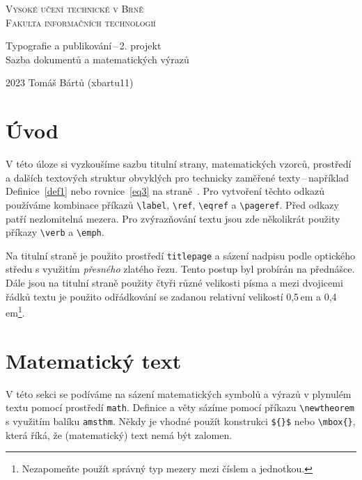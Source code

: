 \documentclass[a4paper,twocolumn,11pt]{article}[06-03-2022]
\theoremstyle{definition}
\begin{document}
\begin{titlepage}
    \begin{center}
        {\Huge \textsc{Vysoké učení technické v Brně} \\[0.5em]
        \huge\textsc{Fakulta informačních technologií}}
        

        {\LARGE Typografie a publikování\,--\,2. projekt \\[0.4em]
        Sazba dokumentů a matematických výrazů}
        
    \end{center}
    { \Large 2023 \hfill Tomáš Bártů (xbartu11) }    
\end{titlepage}


\section*{Úvod}
V této úloze si vyzkoušíme sazbu titulní strany, matematických vzorců, prostředí a dalších textových struktur obvyklých pro technicky zaměřené texty\,--\,například Definice~\ref{def1} nebo rovnice~\eqref{eq3} na straně~\pageref{eq3}. 
Pro vytvoření těchto odkazů používáme kombinace příkazů \verb|\label|, \verb|\ref|, \verb|\eqref| a \verb|\pageref|.
Před odkazy patří nezlomitelná mezera.
Pro zvýrazňování textu jsou zde několikrát použity příkazy \verb|\verb| a \verb|\emph|. 

Na titulní straně je použito prostředí \texttt{titlepage} a sázení nadpisu podle optického středu s využitím \emph{přesného} zlatého řezu. 
Tento postup byl probírán na přednášce. 
Dále jsou na titulní straně použity čtyři různé velikosti písma a mezi dvojicemi řádků textu je použito odřádkování se zadanou relativní velikostí 0,5\,em a 0,4\,em\footnote{Nezapomeňte použít správný typ mezery mezi číslem a jednotkou.}.

\section{Matematický text}
V této sekci se podíváme na sázení matematických symbolů a výrazů v plynulém textu pomocí prostředí \texttt{math}.
Definice a věty sázíme pomocí příkazu \verb|\newtheorem| s využitím balíku \texttt{amsthm}.
Někdy je vhodné použít konstrukci \verb|${}$| nebo \verb|\mbox{}|, která říká, že (matematický) text nemá být zalomen.
\end{document}
